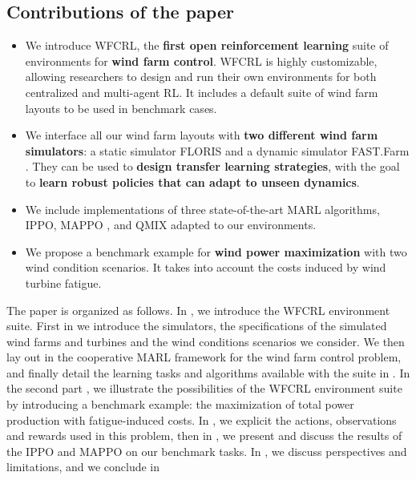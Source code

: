 \documentclass{article}
\begin{document}
\subsection*{Contributions of the paper}
\begin{itemize}
    \item We introduce WFCRL, the \textbf{first open reinforcement learning} suite of environments for \textbf{wind farm control}. WFCRL is highly customizable, allowing researchers to design and run their own environments for both centralized and multi-agent RL. It includes a default suite of wind farm layouts to be used in benchmark cases.
    \item We interface all our wind farm layouts with \textbf{two different wind farm simulators}: a static simulator FLORIS \cite{floris} and a dynamic simulator FAST.Farm \cite{fast.farm}. They can be used to \textbf{design transfer learning strategies}, with the goal to \textbf{learn robust policies that can adapt to unseen dynamics}.
    \item We include implementations of three state-of-the-art MARL algorithms, IPPO, MAPPO \cite{yu2022surprising},  and QMIX \cite{rashid2020monotonic} adapted to our environments.
    \item We propose a benchmark example for \textbf{wind power maximization} with two wind condition scenarios. It takes into account the costs induced by wind turbine fatigue.
\end{itemize}


The paper is organized as follows. In , we introduce the WFCRL environment suite. First in  we introduce the simulators, the specifications of the simulated wind farms and turbines and the wind conditions scenarios we consider. We then lay out in  the cooperative MARL framework for the wind farm control problem, and finally detail the learning tasks and algorithms available with the suite in . In the second part , we illustrate the possibilities of the WFCRL environment suite by introducing a benchmark example: the maximization of total power production with fatigue-induced costs. In , we explicit the actions, observations and rewards used in this problem, then in , we present and discuss the results of the IPPO and MAPPO on our benchmark tasks. In , we discuss perspectives and limitations, and we conclude in 
\end{document}
